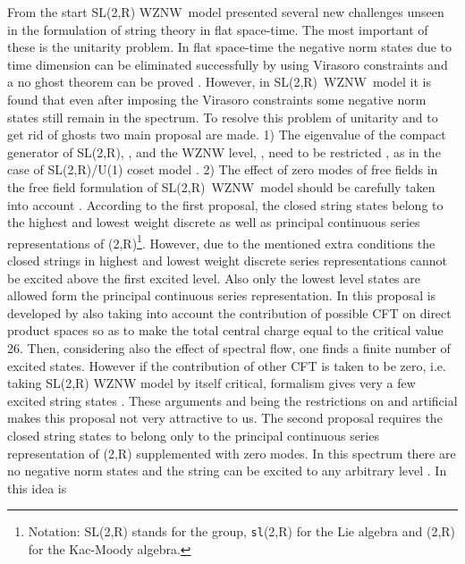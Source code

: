 \documentclass[a4paper,12pt]{article}
\begin{document}
From the start SL(2,R) WZNW\ model presented several new challenges unseen
in the formulation of string theory in flat space-time. The most important
of these is the unitarity problem. In flat space-time the negative norm
states due to time dimension can be eliminated successfully by using
Virasoro constraints and a no ghost theorem can be proved \cite{thorn}.
However, in SL(2,R)\ WZNW\ model it is found that even after imposing the
Virasoro constraints some negative norm states still remain in the spectrum.
To resolve this problem of unitarity and to get rid of ghosts two main
proposal are made. 1) The eigenvalue of the compact generator of SL(2,R), \coordHE{}%
, and the WZNW level, \coordHE{}, need to be restricted \cite{BN},\cite{others1} as
in the case of SL(2,R)/U(1) coset model \cite{peskin}. 2) The effect of zero
modes of free fields in the free field formulation of SL(2,R)\ WZNW\ model
should be carefully taken into account \cite{bars1}. According to the first
proposal, the closed string states belong to the highest and lowest weight
discrete as well as principal continuous series representations of \coordHE{}(2,R)\footnote{%
Notation: SL(2,R) stands for the group, \texttt{sl}(2,R) for the Lie algebra
and \coordHE{}(2,R) for the Kac-Moody algebra.}. However, due
to the mentioned extra conditions the closed strings in highest and lowest
weight discrete series representations cannot be excited above the first
excited level. Also only the lowest level states are allowed form the
principal continuous series representation. In \cite{MO-1} this proposal is
developed by also taking into account the contribution of possible CFT on
direct product spaces so as to make the total central charge equal to the
critical value 26. Then, considering also the effect of spectral flow, one
finds a finite number of excited states. However if the contribution of
other CFT is taken to be zero, i.e. taking SL(2,R) WZNW model by itself
critical, formalism gives very a few excited string states \cite{larsen}.
These arguments and being the restrictions on \coordHE{} and \coordHE{} artificial makes
this proposal not very attractive to us. The second proposal requires the
closed string states to belong only to the principal continuous series
representation of \coordHE{}(2,R) supplemented with zero modes.
In this spectrum there are no negative norm states and the string can be
excited to any arbitrary level \cite{bars1}. In \cite{BDM} this idea is
\end{document}
